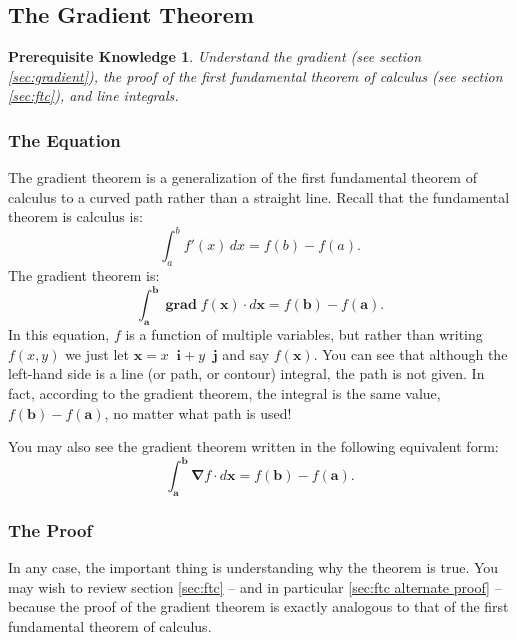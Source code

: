 \documentclass{myarticle}
\DeclareMathOperator{\grad}{\mathbf{grad}}
\renewcommand{\vec}[1]{\mathbf{#1}}
\newcommand{\unitvector}[1]{
  \mathop{}\!\vec{#1}
}
\newcommand{\ih}{\unitvector{i}}
\newcommand{\jh}{\unitvector{j}}
\newcommand{\del}{\boldsymbol{\nabla}}
\theoremstyle{nospace}
\newtheorem*{oldprereq}{Prerequisite Knowledge}
\newenvironment{prereq}
{\begin{mdframed}\begin{oldprereq}}
    {\end{oldprereq}\end{mdframed}}
\newtheorem{old series theorem}{Theorem}
\newenvironment{series theorem}
{\begin{mdframed}\begin{old series theorem}}
    {\end{old series theorem}\end{mdframed}}
\begin{document}
\subsection{The Gradient Theorem}
\label{sec:gradient theorem}

\begin{prereq}
  Understand the gradient (see section \ref{sec:gradient}), the proof
  of the first fundamental theorem of calculus (see section
  \ref{sec:ftc}), and line integrals.
\end{prereq}

\subsubsection{The Equation}
\label{sec:gradient theorem equation}

The gradient theorem is a generalization of the first fundamental
theorem of calculus to a curved path rather than a straight line.
Recall that the fundamental theorem is calculus is:
\[
  \int_a^b f'(x) \,dx = f(b) - f(a).
\]
The gradient theorem is:
\[
  \int_\vec{a}^\vec{b} \grad f(\vec{x}) \cdot d\vec{x}
  = f(\vec{b}) - f(\vec{a}).
\]
In this equation, $f$ is a function of multiple variables, but rather
than writing $f(x, y)$ we just let $\vec{x} = x \ih + y \jh$ and say
$f(\vec{x})$. You can see that although the left-hand side is a line
(or path, or contour) integral, the path is not given. In fact,
according to the gradient theorem, the integral is the same value,
$f(\vec{b}) - f(\vec{a})$, no matter what path is used!

You may also see the gradient theorem written in the following
equivalent form:
\[
  \int_\vec{a}^\vec{b} \del f \cdot d\vec{x} = f(\vec{b}) - f(\vec{a}).
\]

\subsubsection{The Proof}
\label{sec:gradient theorem proof}

In any case, the important thing is understanding why the theorem is
true. You may wish to review section \ref{sec:ftc} -- and in
particular \ref{sec:ftc alternate proof} -- because the proof of the
gradient theorem is exactly analogous to that of the first fundamental
theorem of calculus.
\end{document}
